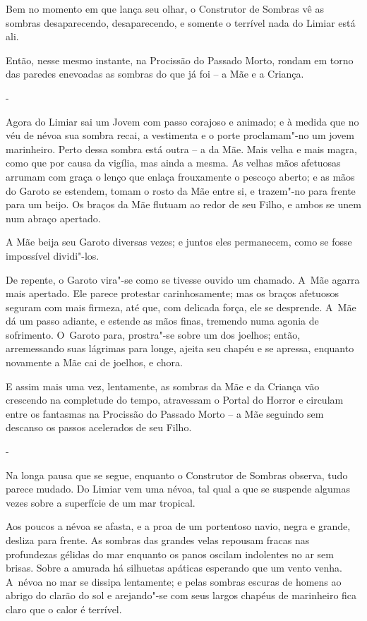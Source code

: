 Bem no momento em que lança seu olhar, o Construtor de Sombras vê as
sombras desaparecendo, desaparecendo, e somente o terrível nada do
Limiar está ali.

Então, nesse mesmo instante, na Procissão do Passado Morto, rondam em
torno das paredes enevoadas as sombras do que já foi -- a Mãe e a
Criança.

-

Agora do Limiar sai um Jovem com passo corajoso e animado; e à medida
que no véu de névoa sua sombra recai, a vestimenta e o porte
proclamam"-no um jovem marinheiro. Perto dessa sombra está outra -- a da
Mãe. Mais velha e mais magra, como que por causa da vigília, mas ainda a
mesma. As velhas mãos afetuosas arrumam com graça o lenço que enlaça
frouxamente o pescoço aberto; e as mãos do Garoto se estendem, tomam o
rosto da Mãe entre si, e trazem"-no para frente para um beijo. Os braços
da Mãe flutuam ao redor de seu Filho, e ambos se unem num abraço
apertado.

A Mãe beija seu Garoto diversas vezes; e juntos eles permanecem, como se
fosse impossível dividi"-los.

De repente, o Garoto vira"-se como se tivesse ouvido um chamado. A~Mãe
agarra mais apertado. Ele parece protestar carinhosamente; mas os braços
afetuosos seguram com mais firmeza, até que, com delicada força, ele se
desprende. A~Mãe dá um passo adiante, e estende as mãos finas, tremendo
numa agonia de sofrimento. O~Garoto para, prostra"-se sobre um dos
joelhos; então, arremessando suas lágrimas para longe, ajeita seu chapéu
e se apressa, enquanto novamente a Mãe cai de joelhos, e chora.

E assim mais uma vez, lentamente, as sombras da Mãe e da Criança vão
crescendo na completude do tempo, atravessam o Portal do Horror e
circulam entre os fantasmas na Procissão do Passado Morto -- a Mãe
seguindo sem descanso os passos acelerados de seu Filho.

-

Na longa pausa que se segue, enquanto o Construtor de Sombras observa,
tudo parece mudado. Do Limiar vem uma névoa, tal qual a que se suspende
algumas vezes sobre a superfície de um mar tropical.

Aos poucos a névoa se afasta, e a proa de um portentoso navio, negra e
grande, desliza para frente. As sombras das grandes velas repousam
fracas nas profundezas gélidas do mar enquanto os panos oscilam
indolentes no ar sem brisas. Sobre a amurada há silhuetas apáticas
esperando que um vento venha. A~névoa no mar se dissipa lentamente; e
pelas sombras escuras de homens ao abrigo do clarão do sol e arejando"-se
com seus largos chapéus de marinheiro fica claro que o calor é terrível.

